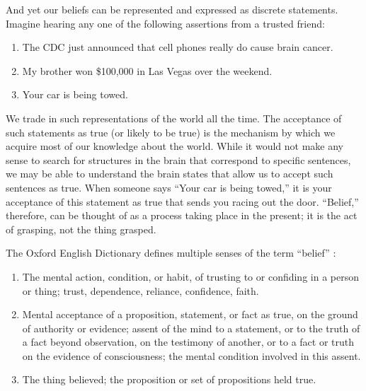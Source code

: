 \documentclass[a4paper,14pt]{extarticle}
\begin{document}
And yet our beliefs can be represented and expressed as discrete statements.
Imagine hearing any one of the following assertions from a trusted friend:

\begin{enumerate}
      \item
            The CDC just announced that cell phones really do cause brain cancer.
      \item
            My brother won \$100,000 in Las Vegas over the weekend.
      \item
            Your car is being towed.

\end{enumerate}

We trade in such representations of the world all the time.
The acceptance of such statements as true (or likely to be true) is the mechanism by which we acquire most of our knowledge about the world.
While it would not make any sense to search for structures in the brain that correspond to specific sentences, we may be able to understand the brain states that allow us to accept such sentences as true.
When someone says ``Your car is being towed,'' it is your acceptance of this statement as true that sends you racing out the door.
``Belief,'' therefore, can be thought of as a process taking place in the present;
it is the act of grasping, not the thing grasped.

The Oxford English Dictionary defines multiple senses of the term ``belief'' :

\begin{enumerate}
      \item
            The mental action, condition, or habit, of trusting to or confiding in a person or thing;
            trust, dependence, reliance, confidence, faith.

      \item
            Mental acceptance of a proposition, statement, or fact as true, on the ground of authority or evidence;
            assent of the mind to a statement, or to the truth of a fact beyond observation, on the testimony of another, or to a fact or truth on the evidence of consciousness;
            the mental condition involved in this assent.

      \item
            The thing believed;
            the proposition or set of propositions held true.

\end{enumerate}
\end{document}
